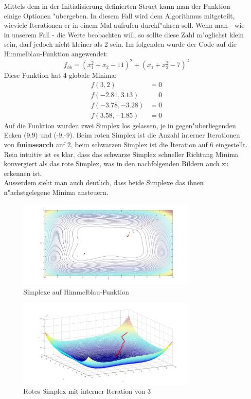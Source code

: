 Mittels dem in der Initialisierung definierten Struct kann man der Funktion einige Optionen "ubergeben. 
In diesem Fall wird dem Algorithmus mitgeteilt, wieviele Iterationen er in einem Mal aufrufen durchf"uhren soll. 
Wenn man - wie in unserem Fall - die Werte beobachten will, so sollte diese Zahl m"oglichst klein sein, darf jedoch nicht kleiner als 2 sein. 
Im folgenden wurde der Code auf die Himmelblau-Funktion angewendet: 
\begin{equation}
	f_{hb} = (x_1^2 + x_2 -11)^2 + (x_1+x_2^2-7)^2
\end{equation}
Diese Funktion hat 4 globale Minima: 
\begin{subequations}
	\begin{align}
		f(3,2) &= 0 \\
		f(-2.81,3.13) &= 0\\
		f(-3.78,-3.28) &= 0\\
		f(3.58,-1.85) &= 0
	\end{align}
\end{subequations}
Auf die Funktion wurden zwei Simplex los gelassen, je in gegen"uberliegenden Ecken (9,9) und (-9,-9). Beim roten Simplex ist die Anzahl interner Iterationen von \textbf{fminsearch} auf 2, beim schwarzen Simplex ist die Iteration auf 6 eingestellt.\\
Rein intuitiv ist es klar, dass das schwarze Simplex schneller Richtung Minima konvergiert als das rote Simplex, was in den nachfolgenden Bildern auch zu erkennen ist. \\
Ausserdem sieht man auch deutlich, dass beide Simplexe das ihnen n"achstgelegene Minima ansteuern. 
\begin{figure}[h]
	\centering
	\includegraphics[width=0.8\textwidth]{../bilder/HimmelblauHoehen.jpg}%
  	\caption{Simplexe auf Himmelblau-Funktion}%
	\label{fig:HB1}%
\end{figure}
\newpage
\begin{figure}[h]
	\centering
	\includegraphics[width=0.8\textwidth]{../bilder/Himmelblau3DRot.jpg}%
  	\caption{Rotes Simplex mit interner Iteration von 3}%
	\label{fig:HB2}%
\end{figure}
